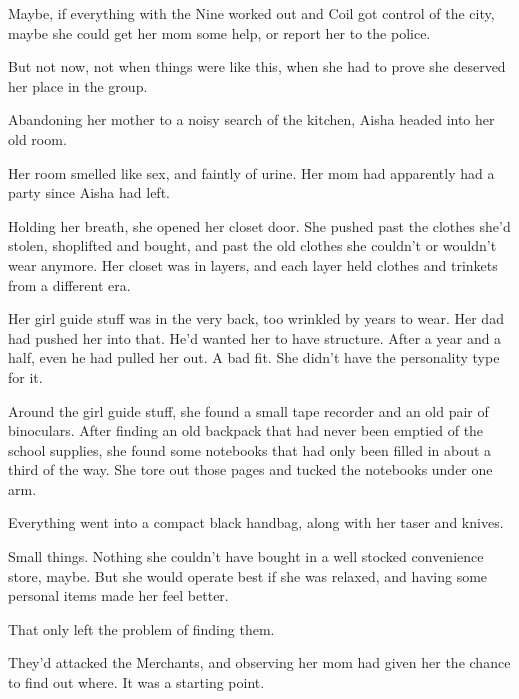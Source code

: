 Maybe, if everything with the Nine worked out and Coil got control of the city, maybe she could get her mom some help, or report her to the police.



But not now, not when things were like this, when she had to prove she deserved her place in the group.



Abandoning her mother to a noisy search of the kitchen, Aisha headed into her old room.



Her room smelled like sex, and faintly of urine.  Her mom had apparently had a party since Aisha had left.



Holding her breath, she opened her closet door.  She pushed past the clothes she'd stolen, shoplifted and bought, and past the old clothes she couldn't or wouldn't wear anymore.  Her closet was in layers, and each layer held clothes and trinkets from a different era.



Her girl guide stuff was in the very back, too wrinkled by years to wear.  Her dad had pushed her into that.  He'd wanted her to have structure.  After a year and a half, even he had pulled her out.  A bad fit.  She didn't have the personality type for it.



Around the girl guide stuff, she found a small tape recorder and an old pair of binoculars.  After finding an old backpack that had never been emptied of the school supplies, she found some notebooks that had only been filled in about a third of the way.  She tore out those pages and tucked the notebooks under one arm.



Everything went into a compact black handbag, along with her taser and knives.



Small things.  Nothing she couldn't have bought in a well stocked convenience store, maybe.  But she would operate best if she was relaxed, and having some personal items made her feel better.



That only left the problem of finding them.



They'd attacked the Merchants, and observing her mom had given her the chance to find out where.  It was a starting point.



